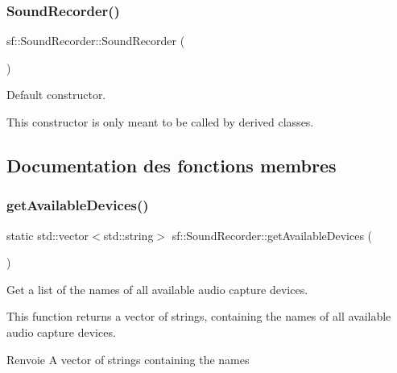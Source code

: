 \subsubsection{\texorpdfstring{Sound\+Recorder()}{SoundRecorder()}}
{\footnotesize\ttfamily sf\+::\+Sound\+Recorder\+::\+Sound\+Recorder (\begin{DoxyParamCaption}{ }\end{DoxyParamCaption})\hspace{0.3cm}{\ttfamily [protected]}}



Default constructor. 

This constructor is only meant to be called by derived classes. 

\subsection{Documentation des fonctions membres}
\mbox{\label{classsf_1_1SoundRecorder_a26198c5c11efcd61f426f326fe314afe}} 
\subsubsection{\texorpdfstring{get\+Available\+Devices()}{getAvailableDevices()}}
{\footnotesize\ttfamily static std\+::vector$<$std\+::string$>$ sf\+::\+Sound\+Recorder\+::get\+Available\+Devices (\begin{DoxyParamCaption}{ }\end{DoxyParamCaption})\hspace{0.3cm}{\ttfamily [static]}}



Get a list of the names of all available audio capture devices. 

This function returns a vector of strings, containing the names of all available audio capture devices.

\begin{DoxyReturn}{Renvoie}
A vector of strings containing the names 
\end{DoxyReturn}
\mbox{\label{classsf_1_1SoundRecorder_ad1d450a80642dab4b632999d72a1bf23}} 
